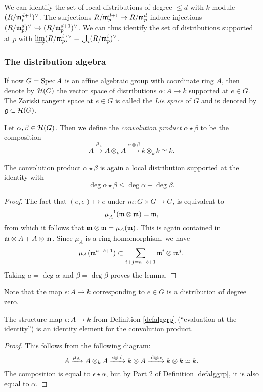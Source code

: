 \documentclass[11pt, english]{article}
\begin{document}
We can identify the set of local distributions of degree $\leq d$ with $k$-module $(R/\mathfrak{m}_p^{d+1})^\vee$. The surjections $R/\mathfrak{m}_p^{d+1} \to R/\mathfrak{m}_p^{d}$ induce injections $(R/\mathfrak{m}_p^d)^\vee \hookrightarrow (R/\mathfrak{m}_p^{d+1})^\vee$. We can thus identify the set of distributions supported at $p$ with $\varinjlim (R/\mathfrak{m}_p^i)^\vee = \bigcup_i (R/\mathfrak{m}_p^i)^\vee$.

\subsubsection{The distribution algebra}

If now $G=\operatorname{Spec} A$ is an affine algebraic group with coordinate ring $A$, then denote by $\mathcal{H}(G)$ the vector space of distributions $\alpha:A \to k$ supported at $e \in G$. The Zariski tangent space at $e \in G$ is called the \emph{Lie space} of $G$ and is denoted by $\mathfrak g \subset \mathcal{H}(G)$.

\begin{defi}
 Let $\alpha,\beta \in \mathcal{H}(G)$. Then we define the \emph{convolution product} $\alpha \star \beta$ to be the composition
$$
A \xrightarrow{\mu_A} A \otimes_k A \xrightarrow{\alpha \otimes \beta} k \otimes_k k \simeq k.
$$
\end{defi}

\begin{lemma}
The convolution product $\alpha \star \beta$ is again a local distribution supported at the identity with
$$
\deg \alpha \star \beta \leq \deg \alpha + \deg \beta.
$$
\end{lemma}
\begin{proof}
The fact that $(e,e) \mapsto e$ under $m:G \times G \to G$, is equivalent to
$$
\mu_A^{-1}(\mathfrak{m} \otimes \mathfrak{m})=\mathfrak{m},
$$
from which it follows that $\mathfrak{m} \otimes \mathfrak{m} = \mu_A(\mathfrak{m})$. This is again contained in $\mathfrak{m} \otimes A + A \otimes \mathfrak{m}$. Since $\mu_A$ is a ring homomorphism, we have
$$
\mu_A(\mathfrak{m}^{a+b+1}) \subset \sum_{i+j=a+b+1} \mathfrak{m}^i \otimes \mathfrak{m}^j.
$$
Taking $a = \deg \alpha$ and $\beta = \deg \beta$ proves the lemma.
\end{proof}

Note that the map $\epsilon:A \to k$ corresponding to $e \in G$ is a distribution of degree zero.

\begin{lemma}
The structure map $\epsilon:A \to k$ from Definition \ref{defalggrp} (``evaluation at the identity'') is an identity element for the convolution product.
\end{lemma}
\begin{proof}
This follows from the following diagram:
\[
A \xrightarrow{\mu_A} A \otimes_k A \xrightarrow{\epsilon \otimes \text{id}} k \otimes A \xrightarrow{\text{id} \otimes \alpha} k \otimes k \simeq k.
\]
The composition is equal to $\epsilon \star \alpha$, but by Part 2 of Definition \ref{defalggrp}, it is also equal to $\alpha$.
\end{proof}
\end{document}
